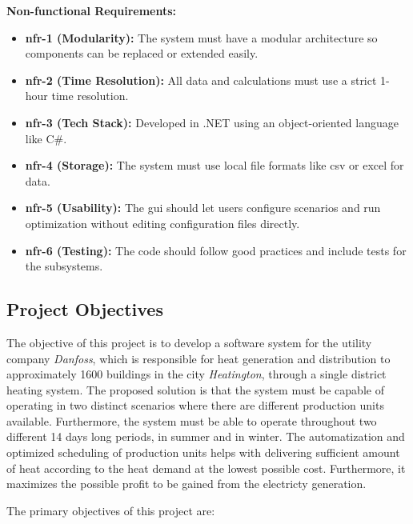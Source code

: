 \vspace{0.5cm}

\noindent \textbf{Non-functional Requirements:}
\begin{itemize}
    \item \textbf{\acrshort{nfr}-1 (Modularity):} The system must have a modular architecture so components can be replaced or extended easily.
    \item \textbf{\acrshort{nfr}-2 (Time Resolution):} All data and calculations must use a strict 1-hour time resolution.
    \item \textbf{\acrshort{nfr}-3 (Tech Stack):} Developed in .NET using an object-oriented language like C\#.
    \item \textbf{\acrshort{nfr}-4 (Storage):}  The system must use local file formats like \acrshort{csv} or excel for data.
    \item \textbf{\acrshort{nfr}-5 (Usability):} The \acrshort{gui} should let users configure scenarios and run optimization without
    editing configuration files directly.
    \item \textbf{\acrshort{nfr}-6 (Testing):} The code should follow good practices and include tests for the subsystems.
\end{itemize}

\subsection{Project Objectives}
The objective of this project is to develop a software system for the utility company \textit{Danfoss},
which is responsible for heat generation and distribution to approximately 1600 buildings in
the city \textit{Heatington}, through a single district heating system. The proposed solution is that the system
must be capable of operating in two distinct scenarios where there are different production units available. Furthermore,
the system must be able to operate throughout two different 14 days long periods, in summer and in winter.
The automatization and optimized scheduling of production units helps with delivering sufficient amount of heat
according to the heat demand at the lowest possible cost. Furthermore, it maximizes the possible profit to be gained
from the electricty generation.

\vspace{0.5cm}

\noindent The primary objectives of this project are:


